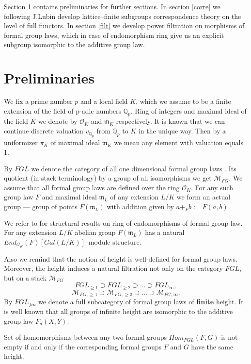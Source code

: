 \documentclass[
11pt,%
tightenlines,%
twoside,%
onecolumn,%
nofloats,%
nobibnotes,%
nofootinbib,%
superscriptaddress,%
noshowpacs,%
centertags]%
{revtex4}
\begin{document}
Section \ref{prelim} contains preliminaries for further sections. In section \ref{corre} we following J.Lubin develop lattice--finite subgroups correspondence theory on the level of full functors. In section \ref{filt} we develop power filtration on morphisms of formal group laws, which in case of endomorphism ring give us an explicit subgroup isomorphic to the additive group law.

\section{Preliminaries}
\label{prelim}
We fix a prime number $p$ and a local field $K$, which we assume to be a finite extension of the field of p-adic numbers $\mathbb{Q}_{p}$. Ring of integers and maximal ideal of the field $K$ we denote by $\mathcal{O}_{K}$ and $\mathfrak{m}_{K}$ respectively. It is known that we can continue discrete valuation $v_{\mathbb{Q}_{p}}$ from $\mathbb{Q}_{p}$ to $K$ in the unique way. Then by a uniformizer $\pi_{K}$ of maximal ideal $\mathfrak{m}_{K}$ we mean any element with valuation equals 1.

By $FGL$ we denote the category of all one dimensional formal group laws \cite{Tate}. Its quotient (in stack terminology) by a group of all isomorphisms we get $\mathcal{M}_{FG}$. We assume that all formal group laws are defined over the ring $\mathcal{O}_{K}$. For any such group law $F$ and maximal ideal $\mathfrak{m}_{L}$ of any extension $L/K$ we form an actual group --- group of points $F(\mathfrak{m}_{L})$ with addition given by $a +_{F} b := F(a,b)$.

We refer to \cite{Lubin1} for structural results on ring of endomorphisms of formal group law.  For any extension $L/K$ abelian group $F(\mathfrak{m}_{L})$ has a natural $End_{\mathcal{O}_{K}}(F)[Gal(L/K)]$--module structure.

Also we remind that the notion of height \cite{Manin} is well-defined for formal group laws. Moreover, the height induces a natural filtration not only on the category $FGL$, but on a stack $\mathcal{M}_{FG}$
$$FGL_{\geq 1} \supset FGL_{\geq 2} \supset \dots \supset FGL_{\infty},$$
$$\mathcal{M}_{FG, \geq 1} \supset \mathcal{M}_{FG, \geq 2} \supset \dots \supset \mathcal{M}_{FG, \infty}.$$
By $FGL_{fin}$ we denote a full subcategory of formal group laws of \textbf{finite} height. It is well known that all groups of infinite height are isomorphic to the additive group law $F_{a}(X,Y)$.

Set of homomorphisms between any two formal groups $Hom_{FGL}(F,G)$ is not empty if and only if the corresponding formal groups $F$ and $G$ have the same height.
\end{document}
